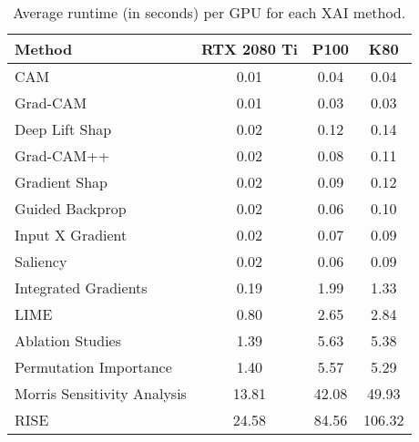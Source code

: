 \begin{table}[ht]
\centering
\begin{tabular}{lccc}
\toprule
Method & RTX 2080 Ti & P100 & K80 \\
\midrule
CAM & 0.01 & 0.04 & 0.04 \\
Grad-CAM & 0.01 & 0.03 & 0.03 \\
Deep Lift Shap & 0.02 & 0.12 & 0.14 \\
Grad-CAM++ & 0.02 & 0.08 & 0.11 \\
Gradient Shap & 0.02 & 0.09 & 0.12 \\
Guided Backprop & 0.02 & 0.06 & 0.10 \\
Input X Gradient & 0.02 & 0.07 & 0.09 \\
Saliency & 0.02 & 0.06 & 0.09 \\
Integrated Gradients & 0.19 & 1.99 & 1.33 \\
LIME & 0.80 & 2.65 & 2.84 \\
Ablation Studies & 1.39 & 5.63 & 5.38 \\
Permutation Importance & 1.40 & 5.57 & 5.29 \\
Morris Sensitivity Analysis & 13.81 & 42.08 & 49.93 \\
RISE & 24.58 & 84.56 & 106.32 \\
\bottomrule
\end{tabular}
\caption{Average runtime (in seconds) per GPU for each XAI method.}
\label{tab:runtime_by_gpu}
\end{table}